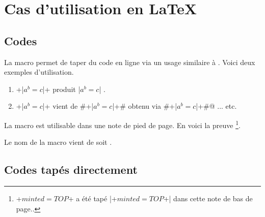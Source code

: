 

\usepackage[lang = french]{../main/main}
\usepackage{../macroenv/macroenv}
\usepackage{../inenglish/inenglish}
\usepackage{../showcase/showcase}
\usepackage{../focus/focus}


\usepackage{listing}




\section{Cas d'utilisation en \LaTeX}

\subsection{Codes }

La macro  permet de taper du code en ligne via un usage similaire à .
Voici deux exemples d'utilisation.

\begin{enumerate}
    \item \bdocinlatex+\bdocinlatex|$a^b = c$|+ produit \bdocinlatex|$a^b = c$| .

    \item \bdocinlatex+\bdocinlatex|$a^b = c$|+ vient de \bdocinlatex#\bdocinlatex+\bdocinlatex|$a^b = c$|+# obtenu via \bdocinlatex@\bdocinlatex#\bdocinlatex+\bdocinlatex|$a^b = c$|+#@ ... etc.
\end{enumerate}


\begin{bdocinfo}
    La macro  est utilisable dans une note de pied de page. En voici la preuve
    \footnote{
    	\bdocinlatex+$minted = TOP$+ a été tapé \bdocinlatex|\bdocinlatex+$minted = TOP$+| dans cette note de bas de page..
    }.
\end{bdocinfo}


\begin{bdocrem}
    Le nom de la macro  vient de  soit .
\end{bdocrem}




\subsection{Codes tapés directement}

